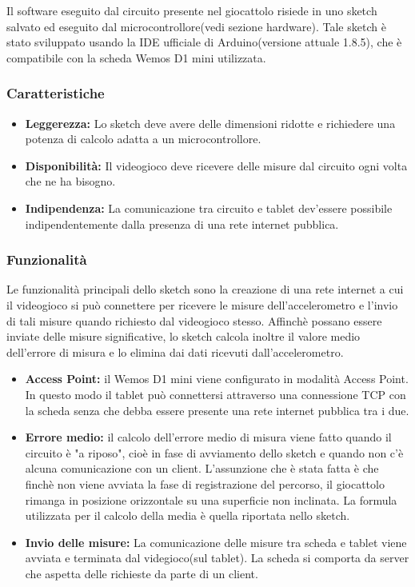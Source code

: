 \documentclass[documentation.tex]{subfiles}
\begin{document}
	Il software eseguito dal circuito presente nel giocattolo risiede in uno sketch salvato ed eseguito dal microcontrollore(vedi sezione hardware). Tale sketch è stato sviluppato usando la IDE ufficiale di Arduino(versione attuale 1.8.5), che è compatibile con la scheda Wemos D1 mini utilizzata.
	\subsubsection{Caratteristiche}
	\begin{itemize}
		\item \textbf{Leggerezza:} Lo sketch deve avere delle dimensioni ridotte e richiedere una potenza di calcolo adatta a un microcontrollore.
		\item \textbf{Disponibilità:} Il videogioco deve ricevere delle misure dal circuito ogni volta che ne ha bisogno.
		\item \textbf{Indipendenza:} La comunicazione tra circuito e tablet dev'essere possibile indipendentemente dalla presenza di una rete internet pubblica.
	\end{itemize}
	\subsubsection{Funzionalità}
	Le funzionalità principali dello sketch sono la creazione di una rete internet a cui il videogioco si può connettere per ricevere le misure dell'accelerometro e l'invio di tali misure quando richiesto dal videogioco stesso. Affinchè possano essere inviate delle misure significative, lo sketch calcola inoltre il valore medio dell'errore di misura e lo elimina dai dati ricevuti dall'accelerometro.
		\begin{itemize}
			\item \textbf{Access Point:} il Wemos D1 mini viene configurato in modalità Access Point. In questo modo il tablet può connettersi attraverso una connessione TCP con la scheda senza che debba essere presente una rete internet pubblica tra i due.
			\item \textbf{Errore medio:} il calcolo dell'errore medio di misura viene fatto quando il circuito è "a riposo", cioè in fase di avviamento dello sketch e quando non c'è alcuna comunicazione con un client. L'assunzione che è stata fatta è che finchè non viene avviata la fase di registrazione del percorso, il giocattolo rimanga in posizione orizzontale su una superficie non inclinata. La formula utilizzata per il calcolo della media è quella riportata nello sketch.
			\item \textbf{Invio delle misure:} La comunicazione delle misure tra scheda e tablet viene avviata e terminata dal videgioco(sul tablet). La scheda si comporta da server che aspetta delle richieste da parte di un client.
		\end{itemize}
\end{document}
